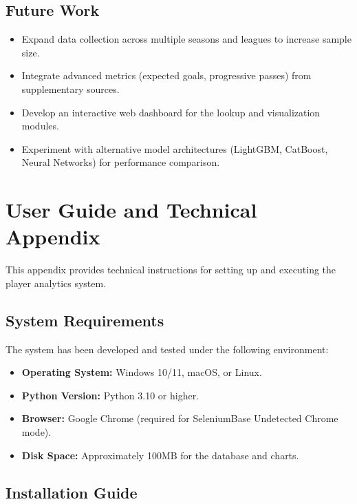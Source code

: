 \documentclass[a4paper,12pt]{report}
\begin{document}
\section{Future Work}

\begin{itemize}
    \item Expand data collection across multiple seasons and leagues to increase sample size.
    \item Integrate advanced metrics (expected goals, progressive passes) from supplementary sources.
    \item Develop an interactive web dashboard for the lookup and visualization modules.
    \item Experiment with alternative model architectures (LightGBM, CatBoost, Neural Networks) for performance comparison.
\end{itemize}



\appendix
\chapter{User Guide and Technical Appendix}

This appendix provides technical instructions for setting up and executing the player analytics system.

\section{System Requirements}

The system has been developed and tested under the following environment:
\begin{itemize}
    \item \textbf{Operating System:} Windows 10/11, macOS, or Linux.
    \item \textbf{Python Version:} Python 3.10 or higher.
    \item \begin{sloppypar} \textbf{Browser:} Google Chrome (required for SeleniumBase Undetected Chrome mode). \end{sloppypar}
    \item \textbf{Disk Space:} Approximately 100MB for the database and charts.
\end{itemize}

\section{Installation Guide}
\end{document}
